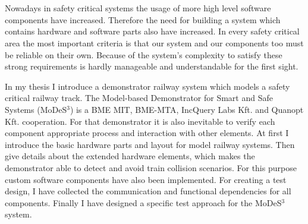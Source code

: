 \chapter{\bevezetes}
Nowadays in safety critical systems the usage of more high level software components have increased. Therefore the need for building a system which contains hardware and software parts also have increased. In every safety critical area the most important criteria is that our system and our components too must be reliable on their own. Because of the system's complexity to satisfy these strong requirements is hardly manageable and understandable for the first sight. 

In my thesis I introduce a demonstrator railway system which models a safety critical railway track. The Model-based Demonstrator for Smart and Safe Systems (MoDeS$^3$) is a BME MIT, BME-MTA, IncQuery Labs Kft. and Quanopt Kft. cooperation. For that demonstrator it is also inevitable to verify each component appropriate process and interaction with other elements. At first I introduce the basic hardware parts and layout for model railway systems. Then give details about the extended hardware elements, which makes the demonstrator able to detect and avoid train collision scenarios. For this purpose custom software components have also been implemented. For creating a test design, I have collected the communication and functional dependencies for all components. Finally I have designed a specific test approach for the MoDeS$^3$ system.

